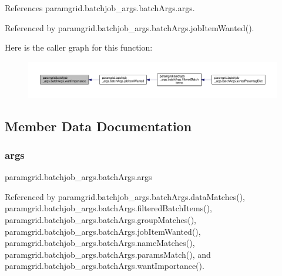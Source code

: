 References paramgrid.\+batchjob\+\_\+args.\+batch\+Args.\+args.



Referenced by paramgrid.\+batchjob\+\_\+args.\+batch\+Args.\+job\+Item\+Wanted().

Here is the caller graph for this function\+:
\nopagebreak
\begin{figure}[H]
\begin{center}
\leavevmode
\includegraphics[width=350pt]{classparamgrid_1_1batchjob__args_1_1batchArgs_ae80716e61fbcf0943666ca8400b6cfa2_icgraph}
\end{center}
\end{figure}


\subsection{Member Data Documentation}
\mbox{\label{classparamgrid_1_1batchjob__args_1_1batchArgs_ade3f5d3931c87514969bf852cbbe7237}} 
\subsubsection{\texorpdfstring{args}{args}}
{\footnotesize\ttfamily paramgrid.\+batchjob\+\_\+args.\+batch\+Args.\+args}



Referenced by paramgrid.\+batchjob\+\_\+args.\+batch\+Args.\+data\+Matches(), paramgrid.\+batchjob\+\_\+args.\+batch\+Args.\+filtered\+Batch\+Items(), paramgrid.\+batchjob\+\_\+args.\+batch\+Args.\+group\+Matches(), paramgrid.\+batchjob\+\_\+args.\+batch\+Args.\+job\+Item\+Wanted(), paramgrid.\+batchjob\+\_\+args.\+batch\+Args.\+name\+Matches(), paramgrid.\+batchjob\+\_\+args.\+batch\+Args.\+params\+Match(), and paramgrid.\+batchjob\+\_\+args.\+batch\+Args.\+want\+Importance().

\mbox{\label{classparamgrid_1_1batchjob__args_1_1batchArgs_ac81fe201dd1936846f35238f74dc92de}} 
